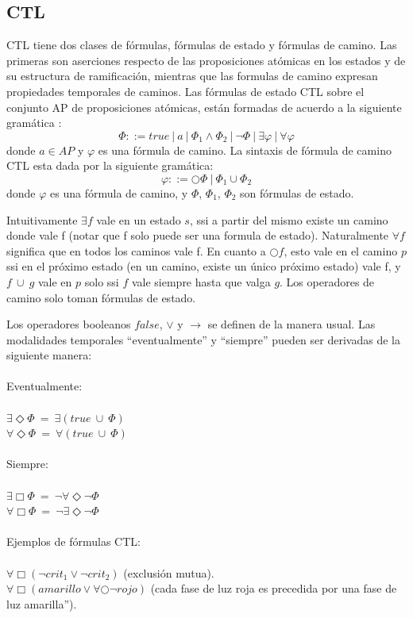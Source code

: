 \subsection{CTL}

\noindent CTL tiene dos clases de fórmulas, fórmulas de estado y fórmulas de camino. Las primeras son aserciones respecto de las proposiciones atómicas en los estados y de su estructura de ramificación, mientras que las formulas de camino expresan propiedades temporales de caminos.
Las fórmulas de estado CTL sobre el conjunto AP de proposiciones atómicas, están formadas de acuerdo a la siguiente gramática \cite{Baier:2}:
\[\Phi ::= true\ |\ a\ |\ \Phi_{1} \land \Phi_{2}\ |\ \neg \Phi\ |\ \exists \varphi\ |\ \forall \varphi  \]
donde $a \in AP$ y $\varphi$ es una fórmula de camino. La sintaxis de fórmula de camino CTL esta dada por la siguiente gramática:
\[\varphi ::= \bigcirc \Phi\ |\ \Phi_{1} \cup \Phi_{2} \]
donde $\varphi$ es una fórmula de camino, y $\Phi$, $\Phi_{1}$, $\Phi_{2}$ son fórmulas de estado.

\noindent Intuitivamente $\exists f$ vale en un estado $s$, ssi a partir del mismo existe un camino donde vale f (notar que f solo puede ser una formula de estado). Naturalmente $\forall f$ significa que en todos los caminos vale f. En cuanto a $\bigcirc f$, esto vale en el camino $p$ ssi en el próximo estado (en un camino, existe un único próximo estado) vale f, y $ f\  \cup \ g$ vale en $p$ solo ssi $f$ vale siempre hasta que valga $g$. Los operadores de camino solo toman fórmulas de estado.

\noindent Los operadores booleanos $false$, $\lor$ y $\to$ se definen de la manera usual. Las modalidades temporales “eventualmente” y “siempre” pueden ser derivadas de la siguiente manera:\\
\\
Eventualmente:\\
\\
$\exists \Diamond \Phi \ = \ \exists(true\ \cup \ \Phi)$\\
$\forall \Diamond \Phi \ = \ \forall(true\ \cup \ \Phi)$\\
\\
Siempre:\\
\\
$\exists \Box \Phi \ = \ \neg \forall \Diamond \neg \Phi$\\
$\forall \Box \Phi \ = \ \neg \exists \Diamond \neg \Phi$\\
\\
Ejemplos de fórmulas CTL:\\
\\
$\forall \Box (\neg crit_{1} \lor \neg crit_{2})$ (exclusión mutua).\\
$\forall \Box (amarillo \lor \forall \bigcirc \neg rojo)$ (cada fase de luz roja es precedida por una fase de luz amarilla”).

